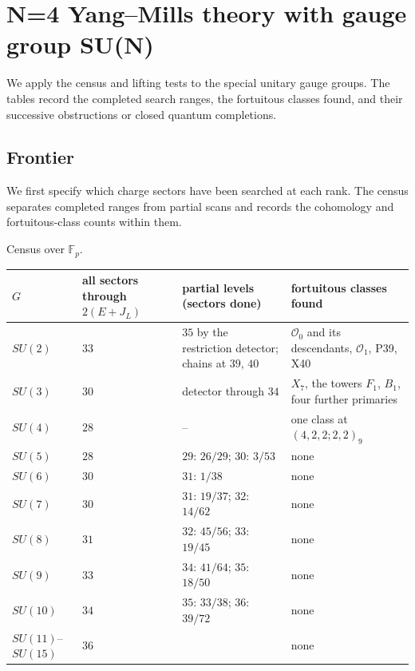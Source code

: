 \documentclass[11pt]{article}
\numberwithin{equation}{section}
\numberwithin{figure}{section}
\numberwithin{table}{section}
\begin{document}
\section{N=4 Yang--Mills theory with gauge group SU(N)}\label{sec-E-SU}

We apply the census and lifting tests to the special unitary gauge groups. The tables record the completed search ranges, the fortuitous classes found, and their successive obstructions or closed quantum completions.

\subsection{Frontier}\label{sec-E-SU-frontier}

We first specify which charge sectors have been searched at each rank. The census separates completed ranges from partial scans and records the cohomology and fortuitous-class counts within them.

Census over $\mathbb F_p$.

{\small\renewcommand{\arraystretch}{1.25}\setlength{\tabcolsep}{4pt}
\begin{xltabular}{\linewidth}{@{}l>{\raggedright\arraybackslash}X>{\raggedright\arraybackslash}X>{\raggedright\arraybackslash}X@{}}
\toprule
$G$ & all sectors through $2(E+J_L)$ & partial levels (sectors done) & fortuitous classes found\\
\midrule\endhead
$SU(2)$ & $33$ & $35$ by the restriction detector; chains at $39$, $40$ & $\mathcal O_0$ and its descendants, $\mathcal O_1$, P39, X40\\
$SU(3)$ & $30$ & detector through $34$ & $X_7$, the towers $F_1$, $B_1$, four further primaries\\
$SU(4)$ & $28$ & -- & one class at $(4,2,2;2,2)_9$\\
$SU(5)$ & $28$ & $29$: $26/29$; $30$: $3/53$ & none\\
$SU(6)$ & $30$ & $31$: $1/38$ & none\\
$SU(7)$ & $30$ & $31$: $19/37$; $32$: $14/62$ & none\\
$SU(8)$ & $31$ & $32$: $45/56$; $33$: $19/45$ & none\\
$SU(9)$ & $33$ & $34$: $41/64$; $35$: $18/50$ & none\\
$SU(10)$ & $34$ & $35$: $33/38$; $36$: $39/72$ & none\\
$SU(11)$--$SU(15)$ & $36$ &  & none\\
\bottomrule
\end{xltabular}}
\end{document}
